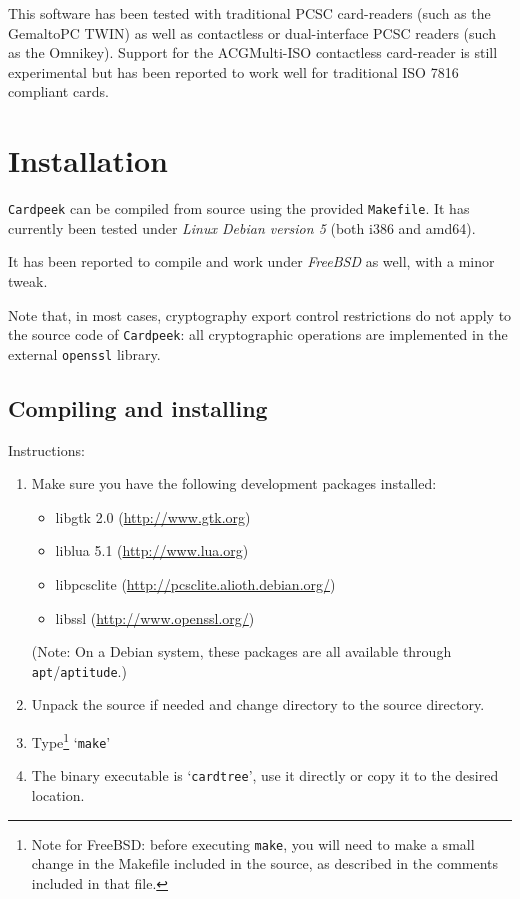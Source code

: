 \documentclass[11pt]{report}
\begin{document}
This software has been tested with traditional PCSC card-readers (such as the Gemalto\texttrademark PC TWIN) 
as well as contactless or dual-interface PCSC readers (such as the Omnikey). 
Support for the ACG\texttrademark Multi-ISO contactless card-reader is still experimental but has been 
reported to work well for traditional ISO 7816 compliant cards.

\tableofcontents

\chapter{Installation}

\texttt{Cardpeek} can be compiled from source using the provided \texttt{Makefile}.
It has currently been tested under \emph{Linux Debian version 5} (both i386 and amd64).

It has been reported to compile and work under \emph{FreeBSD} as well, with a minor tweak.

Note that, in most cases, cryptography export control restrictions do not apply to the source code
of \texttt{Cardpeek}: all cryptographic operations are implemented in the external \texttt{openssl} 
library.

\section{Compiling and installing}

Instructions:
\begin{enumerate}
\item{Make sure you have the following development packages installed:
  \begin{itemize}
  \item{libgtk 2.0 (\url{http://www.gtk.org})}
  \item{liblua 5.1 (\url{http://www.lua.org})}
  \item{libpcsclite (\url{http://pcsclite.alioth.debian.org/})}
  \item{libssl (\url{http://www.openssl.org/})}
  \end{itemize}
(Note: On a Debian system, these packages are all available through \texttt{apt}/\texttt{aptitude}.)}
\item{Unpack the source if needed and change directory to the source directory.}
\item{Type\footnote{Note for FreeBSD: before executing \texttt{make}, 
you will need to make a small change in the Makefile included in the source, 
as described in the comments included in that file.} `\texttt{make}'}
\item{The binary executable is `\texttt{cardtree}', use it directly or copy it to the desired location.}
\end{enumerate}
\end{document}
